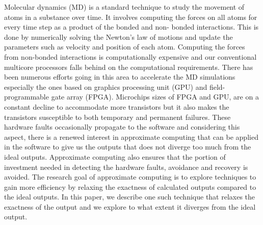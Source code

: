 Molecular dynamics (MD) is a standard technique to study the movement of atoms in a substance over time. It involves computing the forces on all atoms for every time step as a product of the bonded and non- bonded interactions. This is done by numerically solving the Newton's law of motions and update the parameters such as velocity and position of each atom. Computing the forces from non-bonded interactions is computationally expensive and our conventional multicore processors falls behind on the computational requirements. There has been numerous efforts going in this area to accelerate the MD simulations especially the ones based on graphics processing unit (GPU) and field-programmable gate array (FPGA).   
Microchips sizes of FPGA and GPU, are on a constant decline to accommodate more transistors but it also makes the transistors susceptible to both temporary and permanent failures. These hardware faults occasionally propagate to the software and considering this aspect, there is a renewed interest in approximate computing that can be applied in the software to give us the outputs that does not diverge too much from the ideal outputs. Approximate computing also ensures that the portion of investment needed in detecting the hardware faults, avoidance and recovery is avoided. The research goal of approximate computing is to explore techniques to gain more efficiency by relaxing the exactness of calculated outputs compared to the ideal outputs. In this paper, we describe one such technique that relaxes the exactness of the output and we explore to what extent it diverges from the ideal output.
